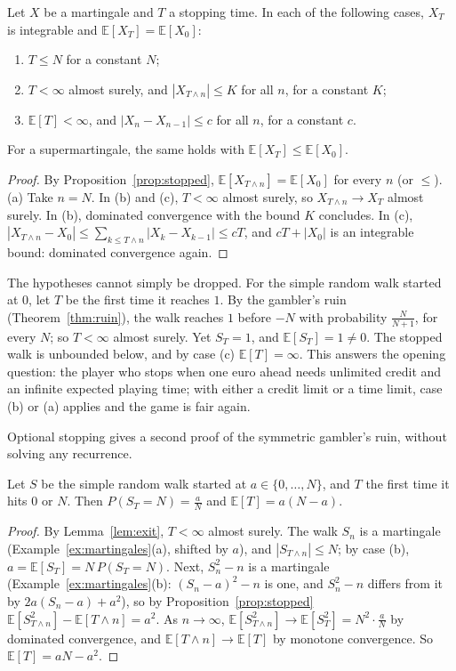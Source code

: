 \begin{theorem}\label{thm:ost}
Let $X$ be a martingale and $T$ a stopping time. In each of the following cases, $X_T$ is integrable and $\mathbb E[X_T]=\mathbb E[X_0]$:
\begin{enumerate}[label=(\alph*)]
\item $T\le N$ for a constant $N$;
\item $T<\infty$ almost surely, and $|X_{T\wedge n}|\le K$ for all $n$, for a constant $K$;
\item $\mathbb E[T]<\infty$, and $|X_n-X_{n-1}|\le c$ for all $n$, for a constant $c$.
\end{enumerate}
For a supermartingale, the same holds with $\mathbb E[X_T]\le\mathbb E[X_0]$.
\end{theorem}
\begin{proof}
By Proposition~\ref{prop:stopped}, $\mathbb E[X_{T\wedge n}]=\mathbb E[X_0]$ for every $n$ (or $\le$). (a) Take $n=N$. In (b) and (c), $T<\infty$ almost surely, so $X_{T\wedge n}\to X_T$
almost surely. In (b), dominated convergence with the bound $K$ concludes. In (c),
$|X_{T\wedge n}-X_0|\le\sum_{k\le T\wedge n}|X_k-X_{k-1}|\le cT$, and $cT+|X_0|$ is an integrable bound: dominated convergence again.
\end{proof}

The hypotheses cannot simply be dropped. For the simple random walk started at $0$, let $T$ be the first time it reaches $1$.
By the gambler's ruin (Theorem~\ref{thm:ruin}), the walk reaches $1$ before $-N$ with probability $\frac N{N+1}$, for every $N$; so $T<\infty$ almost surely.
Yet $S_T=1$, and $\mathbb E[S_T]=1\ne0$. The stopped walk is unbounded below, and by case (c) $\mathbb E[T]=\infty$. This answers the opening question:
the player who stops when one euro ahead needs unlimited credit and an infinite expected playing time; with either a
credit limit or a time limit, case (b) or (a) applies and the game is fair again.

Optional stopping gives a second proof of the symmetric gambler's ruin, without solving any recurrence.

\begin{proposition}\label{prop:ruinost}
Let $S$ be the simple random walk started at $a\in\{0,\dots,N\}$, and $T$ the first time it hits $0$ or $N$. Then $P(S_T=N)=\frac aN$ and $\mathbb E[T]=a(N-a)$.
\end{proposition}
\begin{proof}
By Lemma~\ref{lem:exit}, $T<\infty$ almost surely. The walk $S_n$ is a martingale (Example~\ref{ex:martingales}(a), shifted by $a$), and $|S_{T\wedge n}|\le N$; by case (b),
$a=\mathbb E[S_T]=N\,P(S_T=N)$. Next, $S_n^2-n$ is a martingale (Example~\ref{ex:martingales}(b): $(S_n-a)^2-n$ is one, and $S_n^2-n$ differs from it by $2a(S_n-a)+a^2$), so by Proposition~\ref{prop:stopped}
$\mathbb E[S_{T\wedge n}^2]-\mathbb E[T\wedge n]=a^2$. As $n\to\infty$, $\mathbb E[S^2_{T\wedge n}]\to\mathbb E[S_T^2]=N^2\cdot\frac aN$ by dominated convergence, and $\mathbb E[T\wedge n]\to\mathbb E[T]$ by monotone
convergence. So $\mathbb E[T]=aN-a^2$.
\end{proof}

